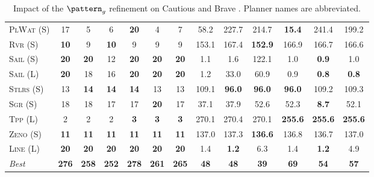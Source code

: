\begin{table}[tb]
{\begin{tabular}{|l||cccccc||cccccc||}
\textsc{PlWat} (S)&17&5&6&\textbf{20}&4&7&58.2&227.7&214.7&\textbf{15.4}&241.4&199.2\\
\textsc{Rvr} (S)&\textbf{10}&9&\textbf{10}&9&9&9&153.1&167.4&\textbf{152.9}&166.9&166.7&166.6\\
\textsc{Sail} (S)&\textbf{20}&\textbf{20}&12&\textbf{20}&\textbf{20}&\textbf{20}&1.1&1.6&122.1&1.0&\textbf{0.9}&1.0\\
\textsc{Sail} (L)&\textbf{20}&18&16&\textbf{20}&\textbf{20}&\textbf{20}&1.2&33.0&60.9&0.9&\textbf{0.8}&\textbf{0.8}\\
\textsc{Stlrs} (S)&13&\textbf{14}&\textbf{14}&\textbf{14}&13&13&109.1&\textbf{96.0}&\textbf{96.0}&\textbf{96.0}&109.2&109.3\\
\textsc{Sgr} (S)&18&18&17&17&\textbf{20}&17&37.1&37.9&52.6&52.3&\textbf{8.7}&52.1\\
\textsc{Tpp} (L)&2&2&2&\textbf{3}&\textbf{3}&\textbf{3}&270.1&270.4&270.1&\textbf{255.6}&\textbf{255.6}&\textbf{255.6}\\
\textsc{Zeno} (S)&\textbf{11}&\textbf{11}&\textbf{11}&\textbf{11}&\textbf{11}&\textbf{11}&137.0&137.3&\textbf{136.6}&136.8&136.7&137.0\\
\textsc{Line} (L)&\textbf{20}&\textbf{20}&\textbf{20}&\textbf{20}&\textbf{20}&\textbf{20}&1.4&\textbf{1.2}&6.3&1.4&\textbf{1.2}&4.9
\\\hline
\textit{Best}&\textbf{276}&\textbf{258}&\textbf{252}&\textbf{278}&\textbf{261}&\textbf{265}&\textbf{48}&\textbf{48}&\textbf{39}&\textbf{69}&\textbf{54}&\textbf{57}\\\hline

        \end{tabular}}
        \caption{Impact of the $\pattern_g$ refinement on Cautious and Brave \pattyd. Planner names are abbreviated.}
        \label{tab:abl-patterng}
        \end{table}
        